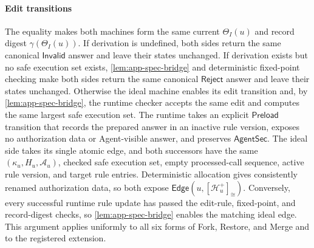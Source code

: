 \paragraph{Edit transitions}
The equality makes both machines form the same current \(\Theta_I(u)\) and record digest \(\gamma(\Theta_I(u))\).
If derivation is undefined, both sides return the same canonical \(\mathsf{Invalid}\) answer and leave their states unchanged.
If derivation exists but no safe execution set exists, \cref{lem:app-spec-bridge} and deterministic fixed-point checking make both sides return the same canonical \(\mathsf{Reject}\) answer and leave their states unchanged.
Otherwise the ideal machine enables its edit transition and, by \cref{lem:app-spec-bridge}, the runtime checker accepts the same edit and computes the same largest safe execution set.
The runtime takes an explicit \(\mathsf{Preload}\) transition that records the prepared answer in an inactive rule version, exposes no authorization data or Agent-visible answer, and preserves \(\mathsf{AgentSec}\).
The ideal side takes its single atomic edge, and both successors have the same \((\kappa_u,H_u,\mathcal A_u)\), checked safe execution set, empty processed-call sequence, active rule version, and target rule entries.
Deterministic allocation gives consistently renamed authorization data, so both expose \(\mathsf{Edge}(u,[\mathcal H_u^+]_{\cong})\).
Conversely, every successful runtime rule update has passed the edit-rule, fixed-point, and record-digest checks, so \cref{lem:app-spec-bridge} enables the matching ideal edge.
This argument applies uniformly to all six forms of Fork, Restore, and Merge and to the registered extension.

